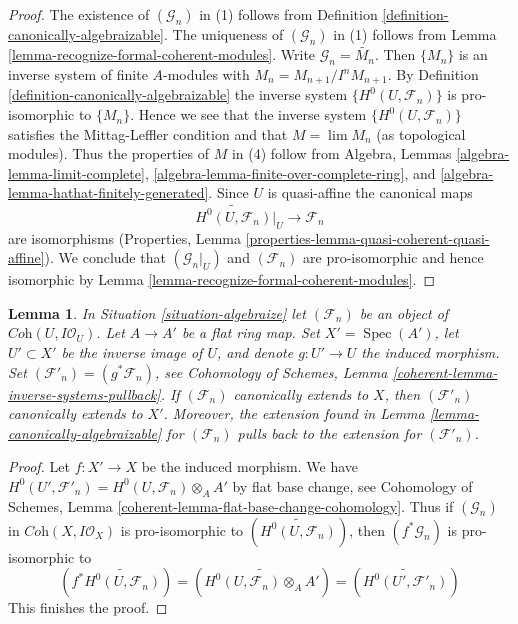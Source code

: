 \documentclass{stacks-project}
\theoremstyle{plain}
\newtheorem{lemma}[subsection]{Lemma}
\theoremstyle{definition}
\theoremstyle{remark}
\numberwithin{equation}{subsection}
\def\lim{\mathop{\mathrm{lim}}\nolimits}
\def\Spec{\mathop{\mathrm{Spec}}}
\begin{document}
\begin{proof}
The existence of $(\mathcal{G}_n)$ in (1) follows from
Definition \ref{definition-canonically-algebraizable}.
The uniqueness of $(\mathcal{G}_n)$ in (1) follows from
Lemma \ref{lemma-recognize-formal-coherent-modules}.
Write $\mathcal{G}_n = \widetilde{M_n}$.
Then $\{M_n\}$ is an inverse system of finite $A$-modules
with $M_n = M_{n + 1}/I^n M_{n + 1}$.
By Definition \ref{definition-canonically-algebraizable}
the inverse system $\{H^0(U, \mathcal{F}_n)\}$
is pro-isomorphic to $\{M_n\}$.
Hence we see that the inverse system $\{H^0(U, \mathcal{F}_n)\}$
satisfies the Mittag-Leffler condition and that
$M = \lim M_n$ (as topological modules).
Thus the properties of $M$ in (4) follow from
Algebra, Lemmas \ref{algebra-lemma-limit-complete},
\ref{algebra-lemma-finite-over-complete-ring}, and
\ref{algebra-lemma-hathat-finitely-generated}.
Since $U$ is quasi-affine the canonical maps
$$
\widetilde{H^0(U, \mathcal{F}_n)}|_U \to \mathcal{F}_n
$$
are isomorphisms (Properties, Lemma
\ref{properties-lemma-quasi-coherent-quasi-affine}).
We conclude that $(\mathcal{G}_n|_U)$ and $(\mathcal{F}_n)$ are
pro-isomorphic and hence isomorphic by
Lemma \ref{lemma-recognize-formal-coherent-modules}.
\end{proof}

\begin{lemma}
\label{lemma-canonically-extend-base-change}
In Situation \ref{situation-algebraize} let $(\mathcal{F}_n)$ be an
object of $\textit{Coh}(U, I\mathcal{O}_U)$. Let $A \to A'$ be a flat ring
map. Set $X' = \Spec(A')$, let $U' \subset X'$ be the inverse image of $U$,
and denote $g : U' \to U$ the induced morphism. Set
$(\mathcal{F}'_n) = (g^*\mathcal{F}_n)$, see
Cohomology of Schemes, Lemma \ref{coherent-lemma-inverse-systems-pullback}.
If $(\mathcal{F}_n)$ canonically extends to $X$, then
$(\mathcal{F}'_n)$ canonically extends to $X'$.
Moreover, the extension found in Lemma \ref{lemma-canonically-algebraizable}
for $(\mathcal{F}_n)$ pulls back to the extension for
$(\mathcal{F}'_n)$.
\end{lemma}

\begin{proof}
Let $f : X' \to X$ be the induced morphism.
We have $H^0(U', \mathcal{F}'_n) = H^0(U, \mathcal{F}_n) \otimes_A A'$ by
flat base change, see Cohomology of Schemes, Lemma
\ref{coherent-lemma-flat-base-change-cohomology}.
Thus if $(\mathcal{G}_n)$ in $\textit{Coh}(X, I\mathcal{O}_X)$
is pro-isomorphic to $(\widetilde{H^0(U, \mathcal{F}_n)})$, then
$(f^*\mathcal{G}_n)$ is pro-isomorphic to
$$
(f^*\widetilde{H^0(U, \mathcal{F}_n)}) =
(\widetilde{H^0(U, \mathcal{F}_n) \otimes_A A'}) =
(\widetilde{H^0(U', \mathcal{F}'_n)})
$$
This finishes the proof.
\end{proof}
\end{document}
